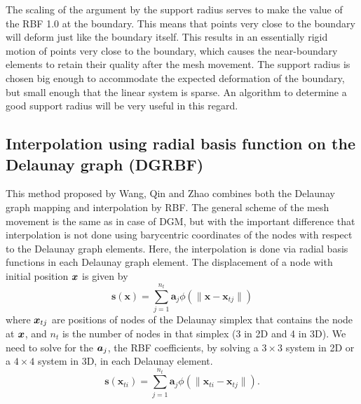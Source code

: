  The scaling of the argument by the support radius serves to make the value of the RBF 1.0 at the boundary. This means that points very close to the boundary will deform just like the boundary itself. This results in an essentially rigid motion of points very close to the boundary, which causes the near-boundary elements to retain their quality after the mesh movement. The support radius is chosen big enough to accommodate the expected deformation of the boundary, but small enough that the linear system is sparse. An algorithm to determine a good support radius will be very useful in this regard.
 
 \subsection[DG-RBF]{Interpolation using radial basis function on the Delaunay graph (DGRBF)}
 This method proposed by Wang, Qin and Zhao \cite{mm:dgrbf} combines both the Delaunay graph mapping and interpolation by RBF. The general scheme of the mesh movement is the same as in case of DGM, but with the important difference that interpolation is not done using barycentric coordinates of the nodes with respect to the Delaunay graph elements. Here, the interpolation is done via radial basis functions in each Delaunay graph element. The displacement of a node with initial position $\boldsymbol{x}$ is given by
 \begin{equation}
 \mathbf{s}(\mathbf{x}) = \sum_{j=1}^{n_t} \mathbf{a}_j \phi(\lVert\mathbf{x} - \mathbf{x}_{tj}\rVert)
 \label{eqn:dgrbf}
 \end{equation}
 where $\boldsymbol{x}_{tj}$ are positions of nodes of the Delaunay simplex that contains the node at $\boldsymbol{x}$, and $n_t$ is the number of nodes in that simplex (3 in 2D and 4 in 3D). We need to solve for the $\boldsymbol{a}_j$, the RBF coefficients, by solving a $3 \times 3$ system in 2D or a $4 \times 4$ system in 3D, in each Delaunay element.
 \begin{equation}
 \mathbf{s}(\mathbf{x}_{ti}) = \sum_{j=1}^{n_t} \mathbf{a}_j \phi(\lVert\mathbf{x}_{ti} - \mathbf{x}_{tj}\rVert).
 \label{eqn:dgrbfsys}
 \end{equation}
 
